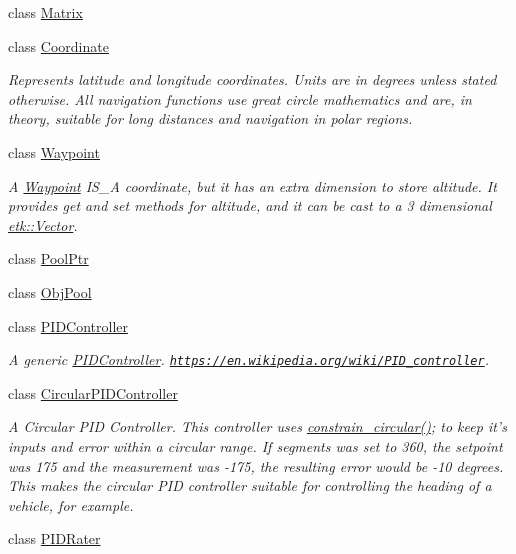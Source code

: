 \begin{DoxyCompactItemize}
class \hyperlink{classetk_1_1_matrix}{Matrix}
\item 
class \hyperlink{classetk_1_1_coordinate}{Coordinate}
\begin{DoxyCompactList}\small\item\em Represents latitude and longitude coordinates. Units are in degrees unless stated otherwise. All navigation functions use great circle mathematics and are, in theory, suitable for long distances and navigation in polar regions. \end{DoxyCompactList}\item 
class \hyperlink{classetk_1_1_waypoint}{Waypoint}
\begin{DoxyCompactList}\small\item\em A \hyperlink{classetk_1_1_waypoint}{Waypoint} I\-S\-\_\-\-A coordinate, but it has an extra dimension to store altitude. It provides get and set methods for altitude, and it can be cast to a 3 dimensional \hyperlink{classetk_1_1_vector}{etk\-::\-Vector}. \end{DoxyCompactList}\item 
class \hyperlink{classetk_1_1_pool_ptr}{Pool\-Ptr}
\item 
class \hyperlink{classetk_1_1_obj_pool}{Obj\-Pool}
\item 
class \hyperlink{classetk_1_1_p_i_d_controller}{P\-I\-D\-Controller}
\begin{DoxyCompactList}\small\item\em A generic \hyperlink{classetk_1_1_p_i_d_controller}{P\-I\-D\-Controller}. \href{https://en.wikipedia.org/wiki/PID_controller}{\tt https\-://en.\-wikipedia.\-org/wiki/\-P\-I\-D\-\_\-controller}. \end{DoxyCompactList}\item 
class \hyperlink{classetk_1_1_circular_p_i_d_controller}{Circular\-P\-I\-D\-Controller}
\begin{DoxyCompactList}\small\item\em A Circular P\-I\-D Controller. This controller uses \hyperlink{namespaceetk_a77f395cb44512ab4a95d08b01b3c7f20}{constrain\-\_\-circular()}; to keep it's inputs and error within a circular range. If segments was set to 360, the setpoint was 175 and the measurement was -\/175, the resulting error would be -\/10 degrees. This makes the circular P\-I\-D controller suitable for controlling the heading of a vehicle, for example. \end{DoxyCompactList}\item 
class \hyperlink{classetk_1_1_p_i_d_rater}{P\-I\-D\-Rater}

\end{DoxyCompactItemize}
